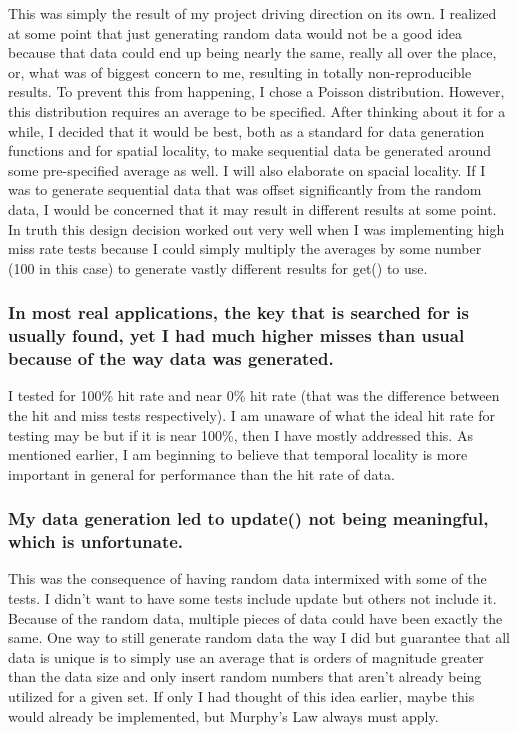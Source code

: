 \documentclass[11pt]{article}
\begin{document}
This was simply the result of my project driving direction on its own. I
realized at some point that just generating random data would not be a good idea
because that data could end up being nearly the same, really all over the
place, or, what was of biggest concern to me, resulting in totally
non-reproducible results. To prevent this from happening, I chose a Poisson
distribution. However, this distribution requires an average to be specified.
After thinking about it for a while, I decided that it would be best, both as a
standard for data generation functions and for spatial locality, to make
sequential data be generated around some pre-specified average as well. I will
also elaborate on spacial locality. If I was to generate sequential data that
was offset significantly from the random data, I would be concerned that it may
result in different results at some point. In truth this design decision worked
out very well when I was implementing high miss rate tests because I could
simply multiply the averages by some number (100 in this case) to generate
vastly different results for get() to use.

\subsubsection{In most real applications, the key that is searched for is
  usually found, yet I had much higher misses than usual because of the way data
was generated.}

I tested for 100\% hit rate and near 0\% hit rate (that was the difference
between the hit and miss tests respectively). I am unaware of what the ideal hit
rate for testing may be but if it is near 100\%, then I have mostly addressed
this. As mentioned earlier, I am beginning to believe that temporal locality is
more important in general for performance than the hit rate of data.

\subsubsection{My data generation led to update() not being meaningful, which is
unfortunate.}

This was the consequence of having random data intermixed with some of the
tests. I didn't want to have some tests include update but others not include
it. Because of the random data, multiple pieces of data could have been exactly
the same. One way to still generate random data the way I did but guarantee that
all data is unique is to simply use an average that is orders of magnitude
greater than the data size and only insert random numbers that aren't already
being utilized for a given set. If only I had thought of this idea earlier,
maybe this would already be implemented, but Murphy's Law always must apply.
\end{document}
